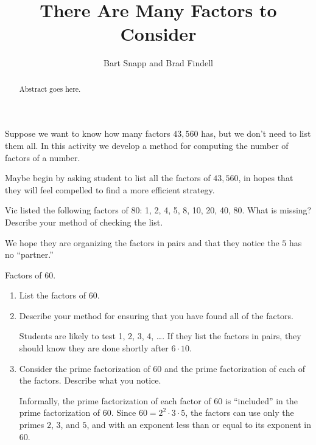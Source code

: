 \documentclass{ximera}
\title{There Are Many Factors to Consider}
\author{Bart Snapp and Brad Findell}
\begin{document}
\begin{abstract}
Abstract goes here.  
\end{abstract}
\maketitle

\label{A:CF}

Suppose we want to know how many factors $43,560$ has, but we don't need to list them all.  In this activity we develop a method for computing the number of factors of a number.  

\begin{teachingnote}
Maybe begin by asking student to list all the factors of $43,560$, in hopes that they will feel compelled to find a more efficient strategy.
\end{teachingnote}

\begin{problem}
Vic listed the following factors of 80:  1, 2, 4, 5, 8, 10, 20, 40, 80.  What is missing? Describe your method of checking the list.  
\vspace{0.2in}
\begin{teachingnote}
We hope they are organizing the factors in pairs and that they notice the $5$ has no ``partner.''  
\end{teachingnote}
\end{problem}

\begin{problem} Factors of 60. 
\begin{enumerate}
\item List the factors of 60. 
\vspace{0.2in}
\item Describe your method for ensuring that you have found all of the factors. 
\vspace{0.2in}
\begin{teachingnote}
Students are likely to test 1, 2, 3, 4, \dots.  If they list the factors in pairs, they should know they are done shortly after $6\cdot10$. 
\end{teachingnote}
\item Consider the prime factorization of 60 and the prime factorization of each of the factors.  Describe what you notice.   
\vspace{0.2in}
\begin{teachingnote}
Informally, the prime factorization of each factor of $60$ is ``included'' in the prime factorization of $60$.  Since $60=2^2\cdot 3\cdot5$, the factors can use only the primes $2$, $3$, and $5$, and with an exponent less than or equal to its exponent in $60$.  
\end{teachingnote}
\end{enumerate}
\end{problem}
\end{document}
